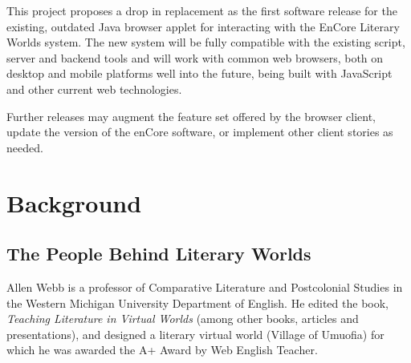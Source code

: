 \documentclass[12pt, letterpaper]{report}
\begin{document}
\par
This project proposes a drop in replacement as the first software release for the existing, outdated Java browser applet for interacting with the EnCore Literary Worlds system. The new system will be fully compatible with the existing script, server and backend tools and will work with common web browsers, both on desktop and mobile platforms well into the future, being built with JavaScript and other current web technologies.



\par
Further releases may augment the feature set offered by the browser client, update the version of the enCore software, or implement other client stories as needed.

	
\tableofcontents

%

\chapter{Background}

\section{The People Behind Literary Worlds}
\par
Allen Webb is a professor of Comparative Literature and Postcolonial Studies in the Western Michigan University Department of English. He edited the book, \textit{Teaching Literature in Virtual Worlds} (among other books, articles and presentations), and designed a literary virtual world (Village of Umuofia) for which he was awarded the A+ Award by Web English Teacher. \cite{Webb Bio}
\end{document}
